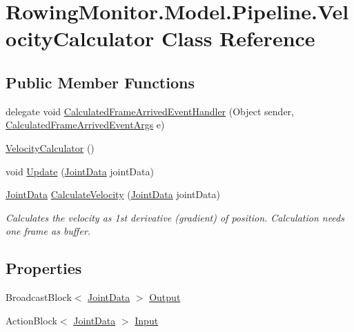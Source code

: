 \hypertarget{class_rowing_monitor_1_1_model_1_1_pipeline_1_1_velocity_calculator}{}\section{Rowing\+Monitor.\+Model.\+Pipeline.\+Velocity\+Calculator Class Reference}
\label{class_rowing_monitor_1_1_model_1_1_pipeline_1_1_velocity_calculator}
\subsection*{Public Member Functions}
\begin{DoxyCompactItemize}
\item 
delegate void \hyperlink{class_rowing_monitor_1_1_model_1_1_pipeline_1_1_velocity_calculator_a8788be37e2e5ff495980455003f16b94}{Calculated\+Frame\+Arrived\+Event\+Handler} (Object sender, \hyperlink{class_rowing_monitor_1_1_model_1_1_calculated_frame_arrived_event_args}{Calculated\+Frame\+Arrived\+Event\+Args} e)
\item 
\hyperlink{class_rowing_monitor_1_1_model_1_1_pipeline_1_1_velocity_calculator_acb35632a51a3bdcb33410a46ed7ac210}{Velocity\+Calculator} ()
\item 
void \hyperlink{class_rowing_monitor_1_1_model_1_1_pipeline_1_1_velocity_calculator_a6e39f143e7cbb1c99eb6f74734dc3be3}{Update} (\hyperlink{struct_rowing_monitor_1_1_model_1_1_util_1_1_joint_data}{Joint\+Data} joint\+Data)
\item 
\hyperlink{struct_rowing_monitor_1_1_model_1_1_util_1_1_joint_data}{Joint\+Data} \hyperlink{class_rowing_monitor_1_1_model_1_1_pipeline_1_1_velocity_calculator_a679bdfdc1c2c8886cbf5dd329c7f5ee6}{Calculate\+Velocity} (\hyperlink{struct_rowing_monitor_1_1_model_1_1_util_1_1_joint_data}{Joint\+Data} joint\+Data)
\begin{DoxyCompactList}\small\item\em Calculates the velocity as 1st derivative (gradient) of position. Calculation needs one frame as buffer. \end{DoxyCompactList}\end{DoxyCompactItemize}
\subsection*{Properties}
\begin{DoxyCompactItemize}
\item 
Broadcast\+Block$<$ \hyperlink{struct_rowing_monitor_1_1_model_1_1_util_1_1_joint_data}{Joint\+Data} $>$ \hyperlink{class_rowing_monitor_1_1_model_1_1_pipeline_1_1_velocity_calculator_ac10c38181683a7ec3493d5bb590b9d06}{Output}
\item 
Action\+Block$<$ \hyperlink{struct_rowing_monitor_1_1_model_1_1_util_1_1_joint_data}{Joint\+Data} $>$ \hyperlink{class_rowing_monitor_1_1_model_1_1_pipeline_1_1_velocity_calculator_a4088ab5421155308f4c0a2cc5eb2a3da}{Input}
\end{DoxyCompactItemize}
